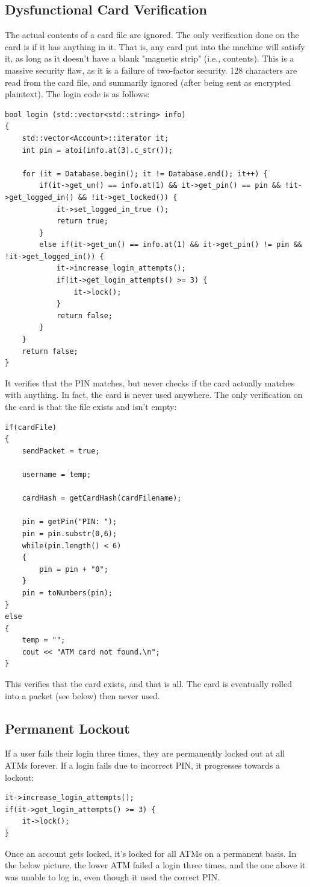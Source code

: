 \documentclass{article}
\begin{document}
\subsection{Dysfunctional Card Verification}
The actual contents of a card file are ignored. The only verification done on the card is if it has anything in it. That is, any card put into the machine will satisfy it, as long as it doesn't have a blank "magnetic strip" (i.e., contents). This is a massive security flaw, as it is a failure of two-factor security. 128 characters are read from the card file, and summarily ignored (after being sent as encrypted plaintext). The login code is as follows:
\begin{lstlisting}
bool login (std::vector<std::string> info) 
{
	std::vector<Account>::iterator it;
	int pin = atoi(info.at(3).c_str());

	for (it = Database.begin(); it != Database.end(); it++) {
		if(it->get_un() == info.at(1) && it->get_pin() == pin && !it->get_logged_in() && !it->get_locked()) {
			it->set_logged_in_true ();
			return true;
		} 
		else if(it->get_un() == info.at(1) && it->get_pin() != pin && !it->get_logged_in()) {
			it->increase_login_attempts();
			if(it->get_login_attempts() >= 3) {
				it->lock();
			}
			return false;
		}
	}
	return false;
}
\end{lstlisting}
It verifies that the PIN matches, but never checks if the card actually matches with anything. In fact, the card is never used anywhere. The only verification on the card is that the file exists and isn't empty:
\begin{lstlisting}
if(cardFile)
{
    sendPacket = true; 

    username = temp;

    cardHash = getCardHash(cardFilename);

    pin = getPin("PIN: ");
    pin = pin.substr(0,6);
    while(pin.length() < 6)
    {
        pin = pin + "0";
    }
    pin = toNumbers(pin);
}
else
{
    temp = "";
    cout << "ATM card not found.\n";
}
\end{lstlisting}
This verifies that the card exists, and that is all. The card is eventually rolled into a packet (see below) then never used.

\subsection{Permanent Lockout}
If a user fails their login three times, they are permanently locked out at all ATMs forever. If a login fails due to incorrect PIN, it progresses towards a lockout:
\begin{lstlisting}
it->increase_login_attempts();
if(it->get_login_attempts() >= 3) {
	it->lock();
}
\end{lstlisting}
Once an account gets locked, it's locked for all ATMs on a permanent basis. In the below picture, the lower ATM failed a login three times, and the one above it was unable to log in, even though it used the correct PIN.
\end{document}

